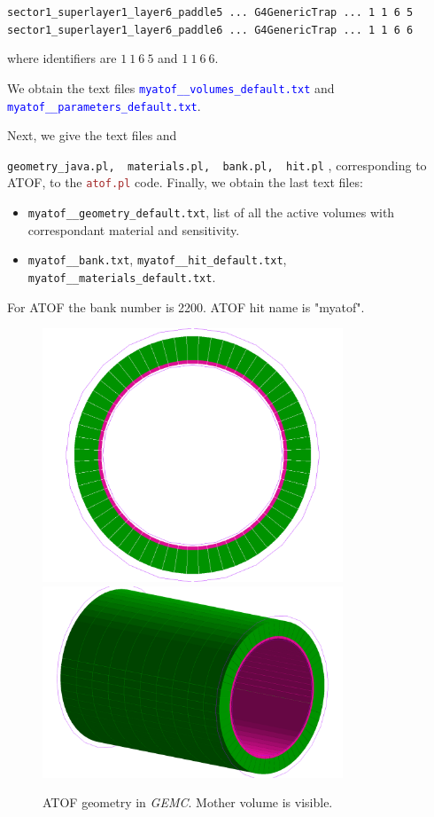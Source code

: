 \texttt{sector1\_superlayer1\_layer6\_paddle5 ... G4GenericTrap ... 1 1 6 5} \\
\texttt{sector1\_superlayer1\_layer6\_paddle6 ... G4GenericTrap ... 1 1 6 6}

where identifiers are $1 \ 1 \ 6 \ 5$ and $1 \ 1 \ 6 \ 6$.

We obtain the text files \textcolor{blue}{\texttt{myatof\_\_volumes\_default.txt}} and \textcolor{blue}{\texttt{myatof\_\_parameters\_default.txt}}. 

Next, we give the text files and {\texttt{geometry\_java.pl, \ materials.pl, \ bank.pl, \ hit.pl} , corresponding to ATOF, to the \textcolor{brown}{\texttt{atof.pl}} code. Finally, we obtain the last text files:
\begin{itemize}
	\item \texttt{myatof\_\_geometry\_default.txt}, list of all the active volumes with correspondant material and sensitivity.
	\item \texttt{myatof\_\_bank.txt}, \texttt{myatof\_\_hit\_default.txt}, \texttt{myatof\_\_materials\_default.txt}.
\end{itemize}

For ATOF the bank number is 2200. ATOF hit name is "myatof". 

\begin{figure}[H]
	\centering
	\includegraphics[width=0.8\textwidth]{gemc_atof_face.png}
	\includegraphics[width=0.8\textwidth]{gemc_atof_profile.png}
	\caption{ATOF geometry in \textit{GEMC}. Mother volume is visible.}
	\label{fig:atof_gemc}
\end{figure}



}
